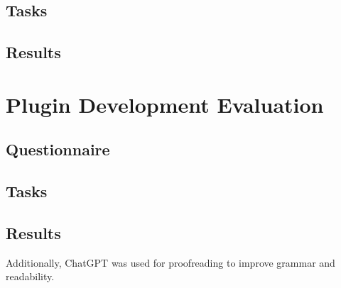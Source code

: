 \documentclass[bachelor]{padsthesis}
\begin{document}
\section{Tasks}
\label{app:tool-evaluation-tasks}


\section{Results}
\label{app:tool-evaluation-results}


\chapter{Plugin Development Evaluation}
\label{app:plugin-evaluation}

\section{Questionnaire}
\label{app:plugin-questionnaire}


\section{Tasks}
\label{app:plugin-evaluation-tasks}


\section{Results}
\label{app:plugin-evaluation-results}


\backmatter
\printbibliography

Additionally, ChatGPT was used for proofreading to improve grammar and readability.
\end{document}
